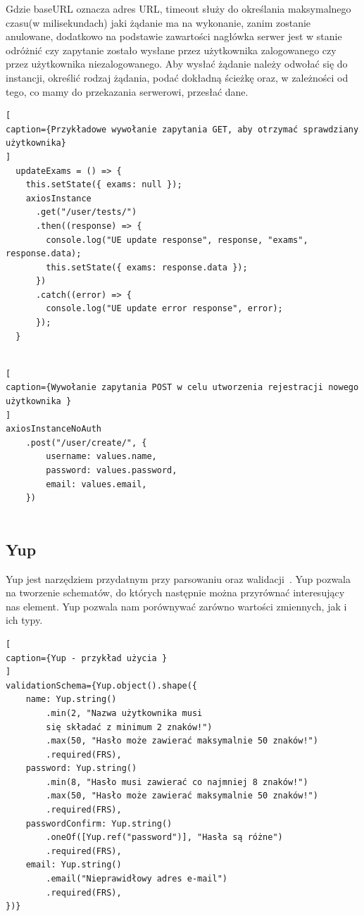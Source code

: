\documentclass[oneside,polski,logo,indent]{amuthesis}
\begin{document}
Gdzie baseURL oznacza adres URL, timeout służy do określania maksymalnego czasu(w milisekundach) jaki żądanie ma na wykonanie, zanim zostanie anulowane, dodatkowo na podstawie zawartości nagłówka serwer jest w stanie odróżnić czy zapytanie zostało wysłane przez użytkownika zalogowanego czy przez użytkownika niezalogowanego. Aby wysłać żądanie należy  odwołać się do instancji, określić rodzaj żądania, podać dokładną ścieżkę oraz, w zależności od tego, co mamy do przekazania serwerowi, przesłać dane.

\begin{lstlisting}[
caption={Przykładowe wywołanie zapytania GET, aby otrzymać sprawdziany użytkownika}
]
  updateExams = () => {
    this.setState({ exams: null });
    axiosInstance
      .get("/user/tests/")
      .then((response) => {
        console.log("UE update response", response, "exams", response.data);
        this.setState({ exams: response.data });
      })
      .catch((error) => {
        console.log("UE update error response", error);
      });
  }


\end{lstlisting}

\pagebreak
\begin{lstlisting}[
caption={Wywołanie zapytania POST w celu utworzenia rejestracji nowego użytkownika }
]
axiosInstanceNoAuth
	.post("/user/create/", {
		username: values.name,
		password: values.password,
		email: values.email,
	})


\end{lstlisting}


\subsection{Yup}
Yup jest narzędziem przydatnym przy parsowaniu oraz walidacji~\cite{yup}. Yup pozwala na tworzenie schematów, do których następnie
można przyrównać interesujący nas element. Yup pozwala nam porównywać zarówno wartości zmiennych, jak i ich typy.

\begin{lstlisting}[
caption={Yup - przykład użycia }
]
validationSchema={Yup.object().shape({
	name: Yup.string()
		.min(2, "Nazwa użytkownika musi 
		się składać z minimum 2 znaków!")
		.max(50, "Hasło może zawierać maksymalnie 50 znaków!")
		.required(FRS),
	password: Yup.string()
		.min(8, "Hasło musi zawierać co najmniej 8 znaków!")
		.max(50, "Hasło może zawierać maksymalnie 50 znaków!")
		.required(FRS),
	passwordConfirm: Yup.string()
		.oneOf([Yup.ref("password")], "Hasła są różne")
		.required(FRS),
	email: Yup.string()
		.email("Nieprawidłowy adres e-mail")
		.required(FRS),
})}


\end{lstlisting}
\end{document}
